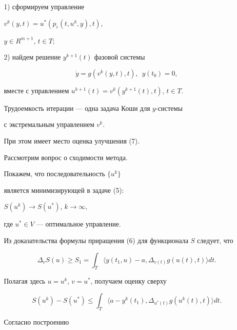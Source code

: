 \noindent{}1) сформируем управление


$v^{k}(y,t)=u^{*}(p_{\varepsilon}(t,u^{k},y),t)$,


$y\in R^{m+1}$, $t\in T$;





\noindent{}2) найдем решение $y^{k+1}(t)$ фазовой системы


$$


\Dot{y}=g(v^{k}(y,t),t),\ \;y(t_{0})=0,


$$


вместе с управлением $u^{k+1}(t)=v^{k}(y^{k+1}(t),t)$, $t\in T$.





Трудоемкость итерации --- одна задача Коши для $y$-системы 


с экстремальным управлением $v^{k}$.


При этом имеет место оценка улучшения (7).





Рассмотрим вопрос о сходимости метода. 


Покажем, что последовательность $\{u^{k}\}$ 


является минимизирующей в задаче (5):


$S(u^{k})\rightarrow S(u^{*})$, $k\rightarrow \infty$,


где $u^{*}\in V$ --- оптимальное управление.





Из доказательства формулы приращения (6) для функционала $S$ следует, что


$$


\Delta_{v}S(u)\geq S_{1}=\int_{T}


\langle y(t_{1},u)-a,\Delta_{v(t)}g(u(t),t)\rangle dt.


$$


Полагая здесь $u=u^{k}$, $v=u^{*}$, получаем оценку сверху 


\begin{equation}


S(u^{k})-S(u^{*})\leq \int_{T}


\langle a-y^{k}(t_{1}),\Delta_{u^{*}(t)}g(u^{k}(t),t)\rangle dt.


\end{equation}


Согласно построению


$$


